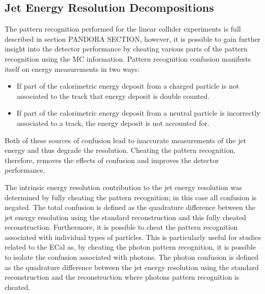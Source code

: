 
\subsection{Jet Energy Resolution Decompositions}
The pattern recognition performed for the linear collider experiments is full described in section PANDORA SECTION, however, it is possible to gain further insight into the detector performance by cheating various parts of the pattern recognition using the MC information.  Pattern recognition confusion manifests itself on energy measurements in two ways:

\begin{itemize}
\item If part of the calorimetric energy deposit from a charged particle is not associated to the track that energy deposit is double counted.
\item If part of the calorimetric energy deposit from a neutral particle is incorrectly associated to a track, the energy deposit is not accounted for.
\end{itemize}

\begin{flushleft}
Both of these sources of confusion lead to inaccurate measurements of the jet energy and thus degrade the resolution.  Cheating the pattern recognition, therefore, removes the effects of confusion and improves the detector performance.  
\end{flushleft}

The intrinsic energy resolution contribution to the jet energy resolution was determined by fully cheating the pattern recognition; in this case all confusion is negated.  The total confusion is defined as the quadrature difference between the jet energy resolution using the standard reconstruction and this fully cheated reconstruction.  Furthermore, it is possible to cheat the pattern recognition associated with individual types of particles.  This is particularly useful for studies related to the ECal as, by cheating the photon pattern recognition, it is possible to isolate the confusion associated with photons.  The photon confusion is defined as the quadrature difference between the jet energy resolution using the standard reconstruction and the reconstruction where photons pattern recognition is cheated.    



